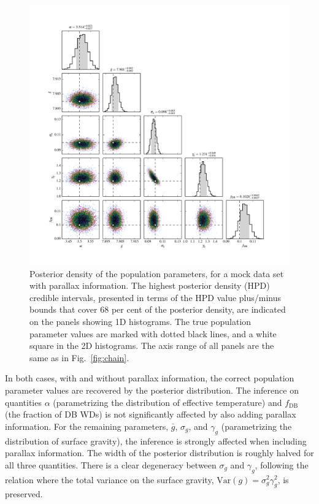 \documentclass[fleqn,usenatbib]{mnras}
\newcommand{\logg}{g}
\begin{document}
\begin{figure}
	\includegraphics[width=1.\textwidth]{toy_chain_include-parallax.pdf}
    \caption{ Posterior density of the population parameters, for a mock data set with parallax information. The highest posterior density (HPD) credible intervals, presented in terms of the HPD value plus/minus bounds that cover 68 per cent of the posterior density, are indicated on the panels showing 1D histograms. The true population parameter values are marked with dotted black lines, and a white square in the 2D histograms. The axis range of all panels are the same as in Fig.~\ref{fig:chain}.}
    \label{fig:chain_parallax}
\end{figure}

In both cases, with and without parallax information, the correct population parameter values are recovered by the posterior distribution. The inference on quantities $\alpha$ (parametrizing the distribution of effective temperature) and $f_\text{DB}$ (the fraction of DB WDs) is not significantly affected by also adding parallax information. For the remaining parameters, $\bar{g}$, $\sigma_g$, and $\gamma_g$ (parametrizing the distribution of surface gravity), the inference is strongly affected when including parallax information. The width of the posterior distribution is roughly halved for all three quantities. There is a clear degeneracy between $\sigma_g$ and $\gamma_g$, following the relation where the total variance on the surface gravity, $\text{Var}(\logg) = \sigma_g^2\gamma_g^2$, is preserved.
\end{document}

